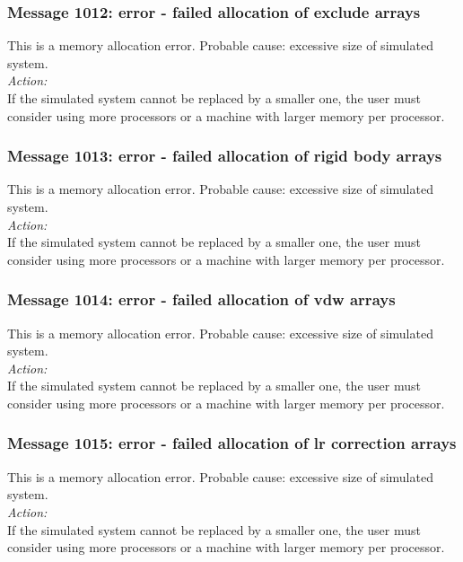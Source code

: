 \subsubsection*{Message 1012: error - failed allocation of exclude
arrays}

This is a memory allocation error. Probable cause: excessive size of
simulated system. \\

\noindent
{\em Action:}\\
If the simulated system cannot be replaced by a smaller one, the user
must consider using more processors or a machine with larger memory
per processor.

\subsubsection*{Message 1013: error - failed allocation of rigid body
arrays}

This is a memory allocation error. Probable cause: excessive size of
simulated system. \\

\noindent
{\em Action:}\\
If the simulated system cannot be replaced by a smaller one, the user
must consider using more processors or a machine with larger memory
per processor.

\subsubsection*{Message 1014: error - failed allocation of vdw arrays}

This is a memory allocation error. Probable cause: excessive size of
simulated system. \\

\noindent
{\em Action:}\\
If the simulated system cannot be replaced by a smaller one, the user
must consider using more processors or a machine with larger memory
per processor.

\subsubsection*{Message 1015: error - failed allocation of lr correction 
arrays}

This is a memory allocation error. Probable cause: excessive size of
simulated system. \\

\noindent
{\em Action:}\\
If the simulated system cannot be replaced by a smaller one, the user
must consider using more processors or a machine with larger memory
per processor.

